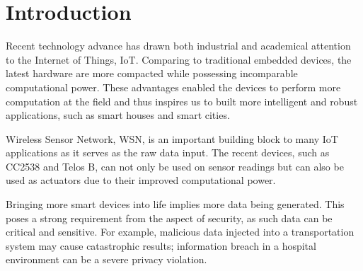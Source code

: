 \chapter{Introduction}
%
%
%
Recent technology advance has drawn both industrial and academical attention  to the Internet of Things, IoT. Comparing to traditional embedded devices, the latest hardware are more compacted while possessing incomparable computational power. These advantages enabled the devices to perform more computation at the field and thus inspires us to built more intelligent and robust applications, such as smart houses and smart cities. 

Wireless Sensor Network, WSN, is an important building block to many IoT applications as it serves as the raw data input. The recent devices, such as CC2538\cite{CC2538} and Telos B\cite{TelosB}, can not only be used on sensor readings but can also be used as actuators due to their improved computational power. 

Bringing more smart devices into life implies more data being generated. This poses a strong requirement from the aspect of security, as such data can be critical and sensitive. For example, malicious data injected into a transportation system may cause catastrophic results; information breach in a hospital environment can be a severe privacy violation.

